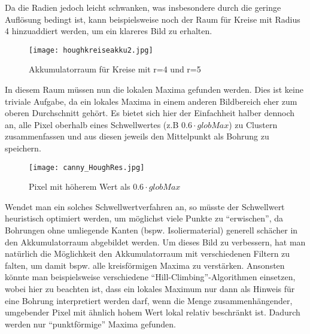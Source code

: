 Da die Radien jedoch leicht schwanken, was insbesondere durch die geringe Auflösung bedingt ist, kann beispielsweise noch der Raum für Kreise mit Radius 4 hinzuaddiert werden, um ein klareres Bild zu erhalten. 

\begin{figure}[H]
  \begin{center}
    \texttt{[image: houghkreiseakku2.jpg]}
    \caption{Akkumulatorraum für Kreise mit r=4 und r=5}
    \label{fig:houghkreiseakku2}
  \end{center}
\end{figure}

In diesem Raum müssen nun die lokalen Maxima gefunden werden. Dies ist keine triviale Aufgabe, da ein lokales Maxima in einem anderen Bildbereich eher zum oberen Durchschnitt gehört. Es bietet sich hier der Einfachheit halber dennoch an, alle Pixel oberhalb eines Schwellwertes (z.B $0.6 \cdot globMax$) zu Clustern zusammenfassen und aus diesen jeweils den Mittelpunkt als Bohrung zu speichern. 

\begin{figure}[H]
  \begin{center}
    \texttt{[image: canny\_HoughRes.jpg]}
    \caption{Pixel mit höherem Wert als $0.6 \cdot globMax$}
    \label{fig:houghkreiseakku2}
  \end{center}
\end{figure}

Wendet man ein solches Schwellwertverfahren an, so müsste der Schwellwert heuristisch optimiert werden, um möglichst viele Punkte zu “erwischen”, da Bohrungen ohne umliegende Kanten (bspw. Isoliermaterial) generell schächer in den Akkumulatorraum abgebildet werden. \newline
Um dieses Bild zu verbessern, hat man natürlich die Möglichkeit den Akkumulatorraum mit verschiedenen Filtern zu falten, um damit bspw. alle kreisförmigen Maxima zu verstärken. \newline
Ansonsten könnte man beispielsweise verschiedene “Hill-Climbing”-Algorithmen einsetzen, wobei hier zu beachten ist, dass ein lokales Maximum nur dann als Hinweis für eine Bohrung interpretiert werden darf, wenn die Menge zusammenhängender, umgebender Pixel mit ähnlich hohem Wert lokal relativ beschränkt ist. Dadurch werden nur “punktförmige” Maxima gefunden.

